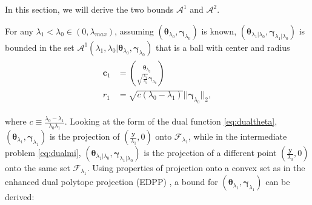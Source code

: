 In this section, we will derive the two bounds $\mathcal{A}^1$ and $\mathcal{A}^2$.

\begin{theorem}
    \label{thm:1.1}
    For any $\lambda_1<\lambda_{0}\in (0,\lambda_{max})$, assuming $(\boldsymbol\theta_{\lambda_0},\boldsymbol\gamma_{\lambda_0})$ is known, $(\boldsymbol\theta_{\lambda_1|\lambda_0},\boldsymbol\gamma_{\lambda_1|\lambda_0})$ is bounded in the set $\mathcal{A}^1(\lambda_1,\lambda_0|\boldsymbol\theta_{\lambda_0},\boldsymbol\gamma_{\lambda_0})$ that is a ball with center and radius
    \begin{gather}
        \begin{aligned}
            \boldsymbol c_1&=\binom{\boldsymbol\theta_{\lambda_0}}{\sqrt{\frac{\lambda_1}{\lambda_0}}\boldsymbol\gamma_{\lambda_0}}\\
            r_1&=\sqrt{c(\lambda_0-\lambda_1)}||\boldsymbol\gamma_{\lambda_0}||_2,
        \end{aligned}
    \end{gather}
\end{theorem}

where $c\equiv\frac{\lambda_0-\lambda_1}{\lambda_0\lambda_1}$. Looking at the form of the dual function \eqref{eq:dualtheta}, $(\boldsymbol\theta_{\lambda_1},\boldsymbol\gamma_{\lambda_1})$ is the projection of $(\frac{\boldsymbol y}{\lambda_1},0)$ onto $\mathcal{F}_{\lambda_1}$, while in the intermediate problem \eqref{eq:dualmi}, $(\boldsymbol\theta_{\lambda_1|\lambda_0},\boldsymbol\gamma_{\lambda_1|\lambda_0})$ is the projection of a different point $(\frac{\boldsymbol y}{\lambda_0},0)$ onto the same set $\mathcal{F}_{\lambda_1}$. Using properties of projection onto a convex set as in the enhanced dual polytope projection (EDPP) \citep{wang2013lasso}, a bound for $(\boldsymbol\theta_{\lambda_1},\boldsymbol\gamma_{\lambda_1})$ can be derived:

